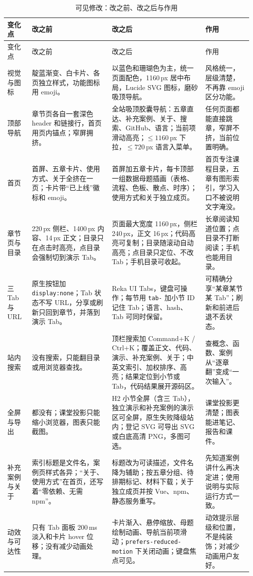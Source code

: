 \documentclass[UTF8,a4paper,11pt,fontset=fandol]{ctexart}
\begin{document}
{\footnotesize
\begin{longtable}{@{}L{1.8cm}L{4.4cm}L{4.7cm}L{3.7cm}@{}}
\caption{可见修改：改之前、改之后与作用}\label{tab:visible}\\
\toprule
变化点 & 改之前 & 改之后 & 作用 \\
\midrule
\endfirsthead
\toprule
变化点 & 改之前 & 改之后 & 作用 \\
\midrule
\endhead
\bottomrule
\endfoot
视觉与图标 & 靛蓝渐变、白卡片、各页独立样式，功能图标用 emoji。 & 以蓝色和珊瑚色为主，统一页面配色，1160\,px 居中布局，Lucide SVG 图标，磨砂吸顶导航。 & 风格统一，层级清楚，不再靠 emoji 区分功能。 \\
顶部导航 & 章节页各自一套深色 header 和链接行，首页用页内锚点；窄屏拥挤。 & 全站吸顶胶囊导航：五章直达、补充案例、关于、搜索、GitHub、语言；当前项滑动高亮；$\le 1160$\,px 下拉，$\le 720$\,px 语言入菜单。 & 任何页面都能直接跳章，窄屏不挤，当前位置明确。 \\
首页 & 首屏、五章卡片、使用方式、关于全挤在一页；卡片带“已上线”徽标和 emoji。 & 首屏加五章卡片，每卡顶部一组数据母题插画（表格、流程、色板、散点、时序）；使用方式和关于独立成页。 & 首页专注课程目录，五章有图形索引，学习入口不被说明文字淹没。 \\
章节页与目录 & 220\,px 侧栏、1400\,px 内容、14\,px 正文；目录只在点击时高亮，点目录会强制切到演示 Tab。 & 页面最大宽度 1160\,px，侧栏 240\,px，正文 16\,px；代码高亮可复制；目录随滚动自动高亮；点目录只定位、不改 Tab；手机目录可收起。 & 长章阅读知道位置；点目录不打断阅读；手机也能用目录。 \\
三 Tab 与 URL & 原生按钮加 \texttt{display:none}；Tab 状态不写 URL，分享或刷新只回到章节，并落到演示 Tab。 & Reka UI Tabs，键盘可操作；每节用 \texttt{tab-} 加小节 ID 记住 Tab；语言、hash、Tab 可同时保留。 & 可精确分享“某章某节某 Tab”；刷新和前进后退不丢状态。 \\
站内搜索 & 没有搜索，只能翻目录或用浏览器查找。 & 顶栏搜索加 Command+K / Ctrl+K；覆盖正文、代码、演示、补充案例、关于；中英文索引、加权排序、高亮；结果定位到小节或 Tab，代码结果展开源码区。 & 查概念、函数、案例从“逐章翻”变成“一次输入”。 \\
全屏与导出 & 都没有；课堂投影只能缩小浏览器，图表只能截图。 & H2 小节全屏（含三 Tab），独立演示和补充案例的演示区可全屏，原生失败降级站内；登记 SVG 可导出 SVG 或白底高清 PNG，多图可选。 & 课堂投影更清楚；图表能进笔记、报告和课件。 \\
补充案例与关于 & 索引标题是文件名，案例页样式各异；“关于、使用方式”在首页，还写着“零依赖、无需 npm”。 & 标题改为可读描述，文件名降为辅助；按五章分组、待排期标记、材料下载；关于独立成页并按 Vue、npm、静态服务重写。 & 先知道案例讲什么再决定进；使用说明与实际运行方式一致。 \\
动效与可达性 & 只有 Tab 面板 200\,ms 淡入和卡片 hover 位移；没有减少动画处理。 & 卡片渐入、悬停缩放、母题绘制动画、导航当前项滑动；\texttt{prefers-reduced-motion} 下关闭动画；键盘焦点可见。 & 动效提示层级和位置，不是纯装饰；对减少动画用户友好。 \\
\end{longtable}
}
\end{document}
